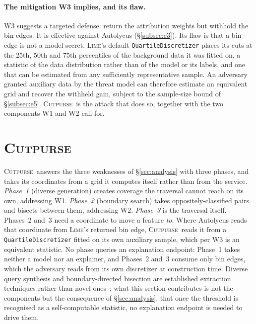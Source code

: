 \documentclass[sigconf,anonymous,review]{acmart}
\newcommand{\sys}{\textsc{Cutpurse}}
\begin{document}
\paragraph{The mitigation W3 implies, and its flaw.}
W3 suggests a targeted defense: return the attribution weights but withhold the bin edges. It is
effective against Autolycus (\S\ref{subsec:e3}). Its flaw is that a bin edge is not a model secret.
\textsc{Lime}'s default \texttt{QuartileDiscretizer} places its cuts at the $25$th, $50$th and $75$th
percentiles of the background data it was fitted on, a statistic of the data distribution rather than
of the model or its labels, and one that can be estimated from any sufficiently representative sample.
An adversary granted auxiliary data by the threat model can therefore estimate an equivalent grid and
recover the withheld gain, subject to the sample-size bound of \S\ref{subsec:e5}. \sys\ is the attack that does so, together with the two components
W1 and W2 call for.

\section{\sys}
\label{sec:method}
\sys\ answers the three weaknesses of \S\ref{sec:analysis} with three phases, and takes its
coordinates from a grid it computes itself rather than from the service. \emph{Phase~1} (diverse
generation) creates coverage the traversal cannot reach on its own, addressing W1. \emph{Phase~2}
(boundary search) takes oppositely-classified pairs and bisects between them, addressing W2.
\emph{Phase~3} is the traversal itself. Phases~2 and~3 need a coordinate to move a feature \emph{to}. Where Autolycus reads that coordinate from \textsc{Lime}'s returned bin edge, \sys\ reads it from a
\texttt{QuartileDiscretizer} fitted on its own auxiliary sample, which per W3 is an equivalent
statistic. No phase queries an explanation endpoint: Phase~1 takes neither a model nor an explainer, and
Phases~2 and~3 consume only bin edges, which the adversary reads from its own discretizer at
construction time. Diverse query synthesis and boundary-directed bisection are established extraction
techniques rather than novel ones~\cite{tramer2016stealing,papernot2017practical,pal2020activethief};
what this section contributes is not the components but the consequence of \S\ref{sec:analysis}, that
once the threshold is recognised as a self-computable statistic, no explanation endpoint is needed to
drive them.
\end{document}

